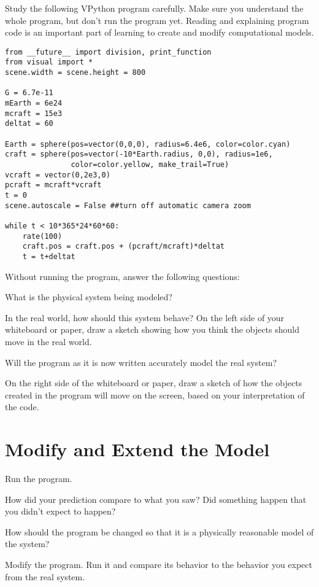 \documentclass[10pt]{article}
\begin{document}
Study the following VPython program carefully. Make sure you understand the whole program, but don't run the program yet. Reading and explaining program code is an important part of learning to create and modify computational models.

\color{CodeColor}
\begin{Verbatim}[frame=single]
from __future__ import division, print_function
from visual import *
scene.width = scene.height = 800

G = 6.7e-11
mEarth = 6e24
mcraft = 15e3
deltat = 60

Earth = sphere(pos=vector(0,0,0), radius=6.4e6, color=color.cyan)
craft = sphere(pos=vector(-10*Earth.radius, 0,0), radius=1e6,
               color=color.yellow, make_trail=True)
vcraft = vector(0,2e3,0)
pcraft = mcraft*vcraft
t = 0
scene.autoscale = False ##turn off automatic camera zoom

while t < 10*365*24*60*60:
    rate(100)     
    craft.pos = craft.pos + (pcraft/mcraft)*deltat
    t = t+deltat
\end{Verbatim}
\color{black}

Without running the program, answer the following questions:

\begin{compactitem}[\color{MIRed}$\Rightarrow$]
\item What is the physical system being modeled? 
\item In the real world, how should this system behave? On the left side of your whiteboard or paper, draw a sketch showing how you think the objects should move in the real world. 
\item Will the program as it is now written accurately model the real system?
\item On the right side of the whiteboard or paper, draw a sketch of how the objects created in the program will move on the screen, based on your interpretation of the code.
\end{compactitem}


\checkpoint

\section{Modify and Extend the Model}

\begin{compactitem}[\color{MIRed}$\Rightarrow$]
\item Run the program.   
\item How did your prediction compare to what you saw? Did something happen that you didn't expect to happen?
\item How should the program be changed so that it is a physically reasonable model of the system?
\item Modify the program.  Run it and compare its behavior to the behavior you expect from the real system.
\end{compactitem}
\end{document}
